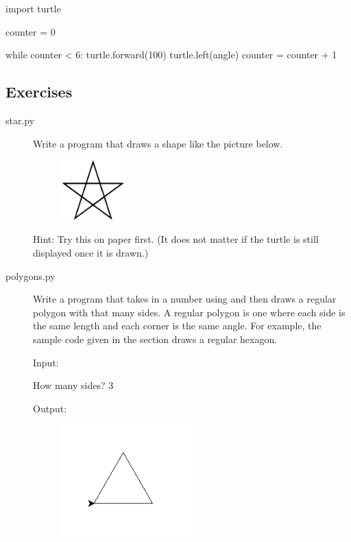 \documentclass[11pt]{cselabheader}
\begin{document}
\begin{python3code}
import turtle

counter = 0

while counter < 6:
    turtle.forward(100)
    turtle.left(angle)
    counter = counter + 1
\end{python3code}

\pagebreak
\subsection{Exercises}
\label{subsec:turtleex}

\begin{description}

  \item[star.py] Write a program that draws a shape like the picture below.

    \begin{figure}[!ht]
      \centering
      \includegraphics[width=1.0in]{img/star}
    \end{figure}

    Hint: Try this on paper first. (It does not matter if the turtle is still
    displayed once it is drawn.)

  \item[polygons.py] Write a program that takes in a number using
     and then draws a regular polygon with that many sides. A
    regular polygon is one where each side is the same length and each corner is
    the same angle. For example, the sample code given in the section draws a
    regular hexagon.

    Input:

    \begin{verbatimcode}
How many sides? 3
    \end{verbatimcode}

    Output:
    \begin{figure}[h]
      \centering
      \includegraphics[width=2.0in]{img/triangle}
    \end{figure}


\end{description}
\end{document}
